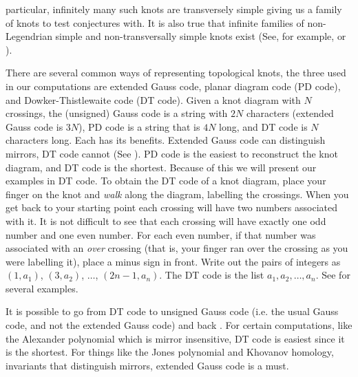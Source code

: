 \documentclass{article}
\theoremstyle{plain}
\begin{document}
        particular, infinitely many such knots are transversely simple giving
        us a family of knots to test conjectures with. It is also true that
        infinite families of non-Legendrian simple and non-transversally simple
        knots exist (See, for example,
        \cite{EtnyreHondaCabling} or \cite{vfoldvari2019legnonsimple}).
        \par\hfill\par
        There are several common ways of representing topological knots, the
        three used in our computations are extended Gauss code, planar diagram
        code (PD code), and Dowker-Thistlewaite code (DT code). Given a knot
        diagram with $N$ crossings, the (unsigned) Gauss code is a string with $2N$
        characters (extended Gauss code is $3N$),
        PD code is a string that is $4N$ long, and DT code is $N$
        characters long. Each has its benefits. Extended Gauss code
        can distinguish mirrors, DT code cannot
        (See \cite{DOWKER198319}). PD code is the easiest to
        reconstruct the knot diagram, and DT code is the shortest. Because of
        this we will present our examples in DT code. To obtain the DT code of
        a knot diagram, place your finger on the knot and \textit{walk} along
        the diagram, labelling the crossings. When you get back to your starting
        point each crossing will have two numbers associated with it. It is
        not difficult to see that each crossing will have exactly one odd number
        and one even number. For each even number, if that number was associated
        with an \textit{over} crossing (that is, your finger ran over the
        crossing as you were labelling it), place a minus sign in front. Write
        out the pairs of integers as $(1,a_{1})$, $(3,a_{2})$, $\dots$,
        $(2n-1,a_{n})$. The DT code is the list $a_{1},a_{2},\dots,a_{n}$.
        See \cite{KatlasDTCode} for several examples.
        \par\hfill\par
        It is possible to go from DT code to unsigned
        Gauss code (i.e. the usual Gauss code, and not the extended Gauss code)
        and back \cite{KhoHoDTCodes}. For certain computations,
        like the Alexander polynomial which
        is mirror insensitive, DT code is easiest since it is the shortest.
        For things like the Jones polynomial and Khovanov homology, invariants
        that distinguish mirrors, extended Gauss code is a must.
        \par\hfill\par
\end{document}

